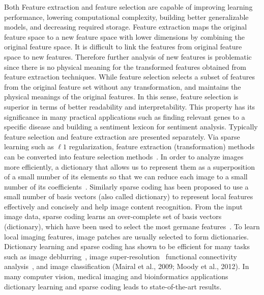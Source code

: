 \documentclass[authoryear,preprint,revi	ew,12pt]{elsarticle}
\begin{document}
Both Feature extraction and feature selection are capable of improving learning performance, lowering computational complexity, building better generalizable models, and decreasing required storage. Feature extraction maps the original feature space to a new feature space with lower dimensions by combining the original feature space. It is difficult to link the features from original feature space to new features. Therefore further analysis of new features is problematic since there is no physical meaning for the transformed features obtained from feature extraction techniques. While feature selection selects a subset of features from the original feature set without any transformation, and maintains the physical meanings of the original features. In this sense, feature selection is superior in terms of better readability and interpretability. This property has its significance in many practical applications such as finding relevant genes to a specific disease and building a sentiment lexicon for sentiment analysis. Typically feature selection and feature extraction are presented separately. Via sparse learning such as $\ell1$ regularization, feature extraction (transformation) methods can be converted into feature selection methods~\citep{masaeli2010transformation}. In order to analyze images more efficiently, a dictionary that allows us to represent them as a superposition of a small number of its elements so that we can reduce each image to a small number of its coefficients~\citep{schnass2008dictionary}. Similarly sparse coding \citep{lin2014stochastic} has been proposed to use a small number of basis vectors (also called dictionary) to represent local features effectively and concisely and help image content recognition. From the input image data, sparse coding learns an over-complete set of basis vectors (dictionary), which have been used to select the most germane features~\citep*{friedman2001elements}. To learn local imaging features, image patches are usually selected to form dictionaries. Dictionary learning and sparse coding \citep{mairal2009online} has shown to be efficient for many tasks such as image deblurring~\citep{yin2008bregman}, image super-resolution~\citep{yin2008bregman} functional connectivity analysis~\cite{lv2015holistic,lv2015modeling}, and image classification (Mairal et al., 2009; Moody et al., 2012). In many computer vision, medical imaging and bioinformatics applications~\citep{mairal2009online,moody2012unsupervised,lv2015modeling} dictionary learning and sparse coding leads to state-of-the-art results.
\end{document}
